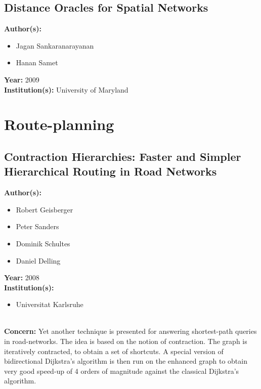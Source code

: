 \documentclass[a4paper]{article}
\newenvironment{itemizesp}
{
    \begin{itemize}
}
{
    \end{itemize}
}
\newcommand{\textbff}[1]{{\large \textbf{#1}}}
\begin{document}
        \subsection{Distance Oracles for Spatial Networks}
        \label{subsec:spatialnetw}

        \textbff{Author(s): }
        \begin{itemizesp}
            \item Jagan Sankaranarayanan
            \item Hanan Samet
        \end{itemizesp}
        \textbff{Year: }2009 \\
        \textbff{Institution(s): } University of Maryland \\

    \pagebreak
    \section{Route-planning}

    \subsection{Contraction Hierarchies: Faster and Simpler Hierarchical Routing in Road Networks}
        \label{subsec:contracthier}

        \textbff{Author(s): }
        \begin{itemizesp}
            \item Robert Geisberger
            \item Peter Sanders
            \item Dominik Schultes
            \item Daniel Delling
        \end{itemizesp}
        \textbff{Year: }2008 \\
        \textbff{Institution(s): }
        \begin{itemizesp}
            \item Universitat Karlsruhe
        \end{itemizesp}
        {\hfill}\\
        \textbff{Concern:} Yet another technique is presented for answering shortest-path queries in road-networks. The idea is based on the notion of contraction. The graph is iteratively contracted, to obtain a set of shortcuts. A special version of bidirectional Dijkstra's algorithm is then run on the enhanced graph to obtain very good speed-up of 4 orders of magnitude against the classical Dijkstra's algorithm.\\
\end{document}
